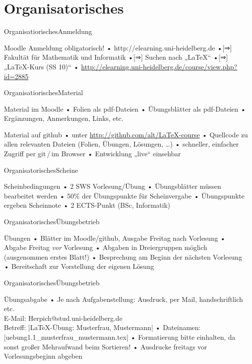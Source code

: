 


\section{Organisatorisches}
\begin{frame}{Organisatiorisches}{Anmeldung}
\begin{block}{Moodle}
Anmeldung obligatorisch!
• http://elearning.uni-heidelberg.de
•[⇒] Fakultät für Mathematik und Informatik
•[⇒] Suchen nach „LaTeX“
•[⇒] „LaTeX-Kurs (SS 10)“
• \url{http://elearning.uni-heidelberg.de/course/view.php?id=2885}
\•
\end{block}
\end{frame}

\begin{frame}{Organisatiorisches}{Material}
\begin{block}{Material im Moodle}
• Folien als pdf-Dateien
• Übungsblätter als pdf-Dateien
• Ergänzungen, Anmerkungen, Links, etc.
\•
\end{block}
\begin{block}{Material auf github}
• unter \url{http://github.com/alt/LaTeX-course}
• Quellcode zu allen relevanten Dateien (Folien, Übungen, Lösungen, …)
• schneller, einfacher Zugriff per git\,/\,im Browser
• Entwicklung „live“ einsehbar
\•
\end{block}
\end{frame}

\begin{frame}{Organisatorisches}{Scheine}
\begin{block}{Scheinbedingungen}
• 2 SWS Vorlesung/Übung
• Übungsblätter müssen bearbeitet werden
• 50\% der Übungspunkte für Scheinvergabe
• Übungspunkte ergeben Scheinnote
• 2 ECTS-Punkt (BSc, Informatik)
\•
\end{block}
\end{frame}

\begin{frame}{Organisatorisches}{Übungsbetrieb}
\begin{block}{Übungen}
• Blätter im Moodle/github, Ausgabe Freitag nach Vorlesung
• Abgabe Freitag \emph{vor} Vorlesung
• Abgaben in Dreiergruppen möglich (ausgenommen erstes Blatt!)
• Besprechung am Beginn der nächsten Vorlesung
• Bereitschaft zur Vorstellung der eigenen Lösung
\•
\end{block}
\end{frame}

\begin{frame}[fragile]{Organisatorisches}{Übungsbetrieb}
\begin{block}{Übungsabgabe}
• Je nach Aufgabenstellung: Ausdruck, per Mail, handschriftlich etc.%
\\ E-Mail: Herpich@stud.uni-heidelberg.de\\%
Betreff: |LaTeX-Übung: Musterfrau, Mustermann|
• Dateinamen: |uebung1.1_musterfrau_mustermann.tex|
• Formatierung bitte einhalten, da sonst großer Mehraufwand beim Sortieren!
• Ausdrucke freitags vor Vorlesungsbeginn abgeben
\•
\end{block}
\end{frame}

